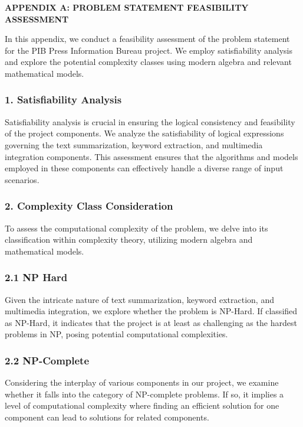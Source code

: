 \documentclass[12pt]{article}
\begin{document}
\pagebreak{}


\begin{center}
    \textbf{APPENDIX A: PROBLEM STATEMENT FEASIBILITY ASSESSMENT}
\end{center} 

In this appendix, we conduct a feasibility assessment of the problem statement for the PIB Press Information Bureau project. We employ satisfiability analysis and explore the potential complexity classes using modern algebra and relevant mathematical models.

\subsubsection*{1. Satisfiability Analysis}

Satisfiability analysis is crucial in ensuring the logical consistency and feasibility of the project components. We analyze the satisfiability of logical expressions governing the text summarization, keyword extraction, and multimedia integration components. This assessment ensures that the algorithms and models employed in these components can effectively handle a diverse range of input scenarios.

\subsubsection*{2. Complexity Class Consideration}

To assess the computational complexity of the problem, we delve into its classification within complexity theory, utilizing modern algebra and mathematical models.

\subsubsection*{2.1 NP Hard}

Given the intricate nature of text summarization, keyword extraction, and multimedia integration, we explore whether the problem is NP-Hard. If classified as NP-Hard, it indicates that the project is at least as challenging as the hardest problems in NP, posing potential computational complexities.

\subsubsection*{2.2 NP-Complete}

Considering the interplay of various components in our project, we examine whether it falls into the category of NP-complete problems. If so, it implies a level of computational complexity where finding an efficient solution for one component can lead to solutions for related components.
\end{document}
